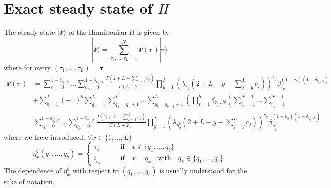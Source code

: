 \documentclass[10pt]{article}
\numberwithin{equation}{section}
\numberwithin{equation}{subsection}
\begin{document}
\section{Exact steady state of $H$}\label{appB}

The steady state $|\Psi\rangle$ of the Hamiltonian $H$ is given by 
\begin{equation}\label{steadyStateH}
	|\Psi\rangle=\sum_{\tau_{1},\ldots,\tau_{L}=1}^{N}\Psi(\bm{\tau})|\bm{\tau}\rangle
\end{equation}
where for every $(\tau_{1},\ldots,\tau_{L})=\bm{\tau}$
\begin{equation}
	\begin{split}
		\Psi(\bm{\tau})&=\sum_{c_{1}=0}^{1-\delta_{\tau_{1},N}}\ldots\sum_{c_{L}=0}^{1-\delta_{\tau_{L},N}}\frac{\Gamma(2+L-\sum_{z=1}^{L}c_{z})}{\Gamma(L+2)}\prod_{y=1}^{L}\left(\lambda_{\tau_{y}}\left(2+L-y-\sum_{j=y}^{L}c_{j}\right)\right)^{c_{y}}\beta_{\tau_{y}}^{(1-c_{y})(1-\delta_{\tau_{y},N})}
		\\&+
		\sum_{b=1}^{L}(-1)^{b}\sum_{q_{1}=1}^{L}\sum_{q_{2}=q_{1}+1}^{L}\ldots\sum_{q_{b}=q_{b-1}+1}^{L}\left(\prod_{r=1}^{b}\delta_{\tau_{q_{r}},N}\right) 
		\sum_{i_{q_{1}}=1}^{N-1}\ldots\sum_{i_{q_{b}}=1}^{N-1}
		\\&
		\sum_{c_{1}=0}^{1-\delta_{\eta_{1}^{b},N}}\ldots\sum_{c_{L}=0}^{1-\delta_{\eta_{L}^{b},N}}\frac{\Gamma(2+L-\sum_{z=1}^{L}c_{z})}{\Gamma(L+2)}\prod_{y=1}^{L}\left(\lambda_{\eta_{y}^{b}}\left(2+L-y-\sum_{j=y}^{L}c_{j}\right)\right)^{c_{y}}\beta_{\eta_{y}^{b}}^{(1-c_{y})(1-\delta_{\eta_{y},N})}
	\end{split}
\end{equation}
where we have introduced, $\forall x\in \{1,\ldots,L\}$
\begin{equation}\label{eta-notation}
	\eta_{x}^{b}(q_{1},\ldots,q_{b})=\begin{cases}
		\tau_{x}\qquad &\text{if}\quad x\notin \{q_{1},\ldots,q_{b}\}\\
		i_{q_{k}}\qquad &\text{if}\quad x=q_{k}\quad \text{with}\quad q_{k}\in\{q_{1},\ldots,q_{b}\}
	\end{cases}%
	\end{equation}
	The dependence of $\eta_{x}^{b}$ with respect to $(q_{1},\ldots,q_{b})$ is usually understood for the sake of notation. 
\end{document}
